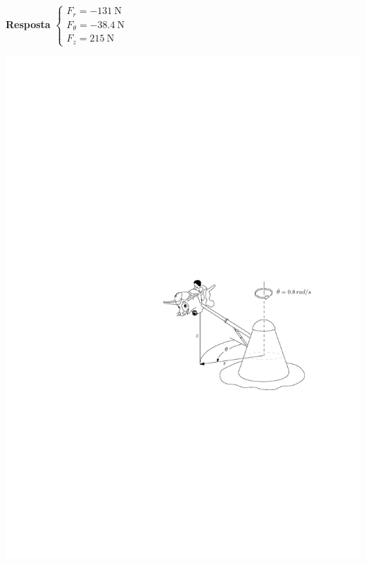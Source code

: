 \documentclass[a4paper,12pt]{article}
\begin{document}
\begin{enumerate}
		\textbf{Resposta}
		$
		\begin{cases}
		F_{r}=\SI{-131}{\newton}\\
		F_{\theta}=\SI{-38.4}{\newton}\\
		F_{z}=\SI{215}{\newton}
		\end{cases}
		$
		\vspace{-2.5cm}
		\begin{flushright}
			\includegraphics[scale=1.27]{images/draw_13.pdf}
		\end{flushright}
	\end{enumerate}
	
\end{document}
